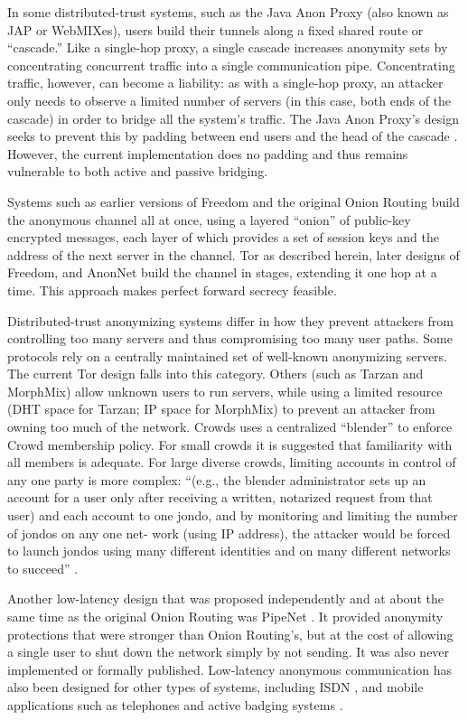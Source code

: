 \documentclass[times,10pt,twocolumn]{article}
\begin{document}
In some distributed-trust systems, such as the Java Anon Proxy (also known as
JAP or WebMIXes), users
build their tunnels along a fixed shared route or
``cascade.''  Like a single-hop proxy, a single cascade increases anonymity
sets by concentrating concurrent traffic into a single communication pipe.
Concentrating traffic, however, can become a liability: as with a single-hop
proxy, an attacker only needs to observe a limited number of servers (in this
case, both ends of the cascade) in order
to bridge all the system's traffic.
The Java Anon Proxy's design seeks to prevent this by padding
between end users and the head of the cascade \cite{web-mix}. However, the
current implementation does no padding and thus remains vulnerable
to both active and passive bridging.

Systems such as earlier versions of Freedom and the original Onion Routing
build the anonymous channel all at once, using a layered ``onion'' of
public-key encrypted messages, each layer of which provides a set of session
keys and the address of the next server in the channel.  Tor as described
herein, later designs of Freedom, and AnonNet \cite{anonnet} build the
channel in stages, extending it one hop at a time. This approach
makes perfect forward secrecy feasible.

Distributed-trust anonymizing systems differ in how they prevent attackers
from controlling too many servers and thus compromising too many user paths.
Some protocols rely on a centrally maintained set of well-known anonymizing
servers.  The current Tor design falls into this category.
Others (such as Tarzan and MorphMix) allow unknown users to run
servers, while using a limited resource (DHT space for Tarzan; IP space for
MorphMix) to prevent an attacker from owning too much of the network.
Crowds uses a centralized ``blender'' to enforce Crowd membership
policy. For small crowds it is suggested that familiarity with all
members is adequate. For large diverse crowds, limiting accounts in
control of any one party is more complex: 
``(e.g., the blender administrator sets up an account for a user only
after receiving a written, notarized request from that user) and each
account to one jondo, and by monitoring and limiting the number of
jondos on any one net- work (using IP address), the attacker would be
forced to launch jondos using many different identities and on many
different networks to succeed'' \cite{crowds-tissec}.

Another low-latency design that was proposed independently and at
about the same time as the original Onion Routing was PipeNet
\cite{pipenet}.  It provided anonymity protections that were stronger
than Onion Routing's, but at the cost of allowing a single user to
shut down the network simply by not sending. It was also never
implemented or formally published. Low-latency anonymous communication
has also been designed for other types of systems, including
ISDN \cite{isdn-mixes}, and mobile applications such as telephones and
active badging systems \cite{federrath-ih96,reed-protocols97}.
\end{document}
